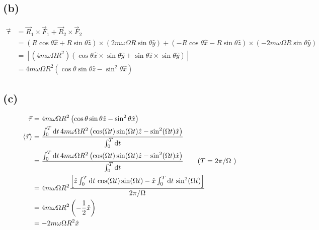 \documentclass[letter, 10pts]{article}
\begin{document}
\subsection*{(b)} 
\begin{align*}
\vec{\tau} &= 
\vec{R}_1 \times \vec{F}_1 + \vec{R}_2 \times  \vec{F}_2  
\\
&= 
\left(
R \cos \theta \hat{x} + R \sin \theta \hat{z}
\right) \times  ( 2m \omega \Omega R \sin \theta \hat{y})
+ \left(
 -R \cos \theta \hat{x} - R \sin \theta \hat{z}
\right) \times  (- 2m \omega \Omega R \sin \theta \hat{y})
\\
&= 
\left[
	(4 m  \omega \Omega R^2 ) \left(\cos \theta \hat{x} \times \sin \theta \hat{y} + \sin \theta \hat{z} \times  \sin \theta \hat{y}\right)
\right]
\\
&= 
	4 m \omega \Omega R^2  \left(\cos \theta \sin \theta \hat{z}   - \sin ^2 \theta \hat{x}\right)
\end{align*}













\subsection*{(c)} 
\begin{align*}
	\vec{\tau} &= 4 m \omega \Omega R^2 \left(\cos \theta\sin \theta \hat{z} - \sin ^2 \theta \hat{x} \right) \\
	\braket{ \vec{\tau}} 
		   &= \frac{\int_{0}^{T} \mathrm{d} t \,  4 m \omega \Omega R^2 
		   \left(\cos (\Omega t) \sin (\Omega t) \hat{z} - \sin ^2 (\Omega t) \hat{x} \right)}{\int_{0}^{T } \mathrm{d} t }  \\ 
		   &= \frac{\int_{0}^{T} \mathrm{d} t \,  4 m \omega \Omega R^2 
		   \left(\cos (\Omega t) \sin (\Omega t) \hat{z} - \sin ^2 (\Omega t) \hat{x} \right)}{\int_{0}^{T } \mathrm{d} t } 
		   \tag{$T = 2 \pi / \Omega$ } \\ 
&= 
{4 m \omega \Omega R^2} 
\frac{\left[ \hat{z}
\int_{0}^{T} \mathrm{d} t \, \cos(\Omega t) \sin(\Omega t)  - 
\hat{x} \int_{0}^{T} \mathrm{d} t \, \sin ^2 (\Omega t)  
\right]}{2 \pi / \Omega} 
\\
&= 
4 m \omega \Omega R^2 \left(
- \frac{1}{2} \hat{x}
\right)
\\
&= 
-2 m \omega \Omega R^2 
\hat{x}
\\
\end{align*}
\end{document}
